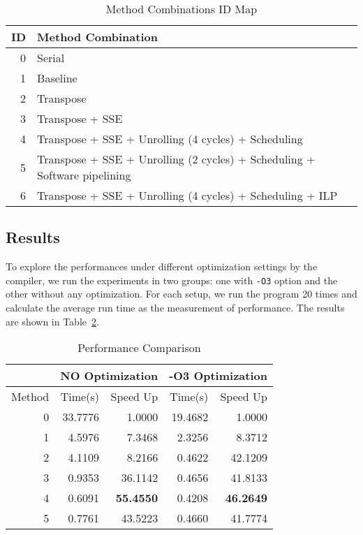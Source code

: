 \documentclass[12pt]{article}
\begin{document}
\begin{table}[h!]
	\small
	\begin{center}
	\caption{\label{tab:methods} Method Combinations ID Map}
	\begin{tabular}{|r|l|}
		\hline
		ID & Method Combination \\ \hline
		0 &	Serial \\ \hline
		1 & Baseline \\ \hline
    2 & Transpose \\ \hline
    3 & Transpose + SSE \\ \hline
    4 & Transpose + SSE + Unrolling (4 cycles) + Scheduling \\ \hline
    5 & Transpose + SSE + Unrolling (2 cycles) + Scheduling + 
      Software pipelining \\ \hline
    6 & Transpose + SSE + Unrolling (4 cycles) + Scheduling + ILP\\ \hline
	\end{tabular}
	\end{center}
\end{table}

\subsection{Results}
To explore the performances under different optimization settings by 
the compiler, we run the experiments in two groups: one with 
\texttt{-O3} option and the other without any optimization. For 
each setup, we run the program 20 times and calculate the average 
run time as the measurement of performance. The results are shown in 
Table~\ref{tab:performance}.

\begin{table}[h!]
	\small
	\begin{center}
	\caption{\label{tab:performance} Performance Comparison}
	\begin{tabular}{|r|r|r|r|r|}
		\hline
		 & \multicolumn{2}{c|}{NO Optimization} & \multicolumn{2}{c|}{-O3 Optimization} \\ \hline
		Method & Time(s) & Speed Up & Time(s) & Speed Up \\ \hline
		0  &  33.7776	& 1.0000		&19.4682		&	1.0000 \\ \hline
		1  &		4.5976		&	7.3468		& 2.3256		&	8.3712 \\ \hline
		2  &		4.1109  & 8.2166		&	0.4622		&	42.1209 \\ \hline
		3  &		0.9353  & 36.1142	&	0.4656		&	41.8133 \\ \hline
		4  &		0.6091  & \textbf{55.4550}	& 0.4208		&	\textbf {46.2649} \\ \hline
		5  &		0.7761  & 43.5223	&	0.4660		&	41.7774 \\ \hline
	\end{tabular}
	\end{center}
\end{table}
\end{document}

